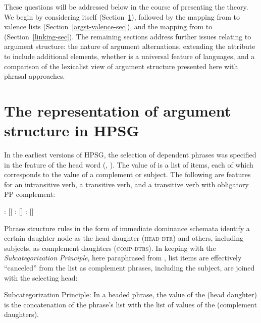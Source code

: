 \documentclass[output=paper,biblatex,babelshorthands,newtxmath,draftmode,colorlinks, citecolor=brown]{langscibook}
\begin{document}
\noindent
These questions will be addressed below in the course of presenting the theory.  We begin by
considering \argst itself (Section~\ref{sec:arg-st}), followed by the mapping from \argst to
valence lists (Section~\ref{argst-valence-sec}), and the mapping from \content to \argst
(Section~\ref{linking-sec}). The remaining sections
address further issues relating to argument structure: the nature of argument alternations,
extending the \argst attribute to include additional elements, whether \argst is a universal feature
of languages, and a comparison of the lexicalist view of argument structure presented here with
phrasal approaches. 


\section{The representation of argument structure in HPSG}
\label{sec:arg-st}

\largerpage
In the earliest versions of HPSG, the selection of dependent phrases was specified in the \subcat
feature of the head word (\citealt{pollard+sag:1987},
\citealt[Chapters~1--8]{pollard+sag:1994}).  The value of \subcat is a list of items, each of which
corresponds to the \synsem value of a complement or subject.  The following are \subcat features for
an intransitive verb, a transitive verb, and a transitive verb with obligatory PP complement:


\begin{exe} 
\ex \label{subcats}
\begin{xlist}
\ex {}: $[$\subcat {}$]$
\ex {}:   $[$\subcat {}$]$
\ex {}:   $[$\subcat {}$]$
\end{xlist}
\end{exe}

\noindent
Phrase structure rules in the form of immediate dominance schemata
identify a certain daughter node as the head daughter (\textsc{head-dtr}) and others, including
subjects, as complement daughters (\textsc{comp-dtrs}).  In keeping with the \emph{Subcategorization
  Principle}, here paraphrased from ,
list items are effectively ``canceled'' from the \subcat list as complement phrases, including the
subject, are joined with the selecting head:

\begin{exe}
  \ex Subcategorization Principle: In a headed phrase, the \subcat value of the \headdtr (head
  daughter) is the concatenation of the phrase's \subcat list with the list of \synsem values of the
  \compsdtrs (complement daughters).
\end{exe}
\end{document}
